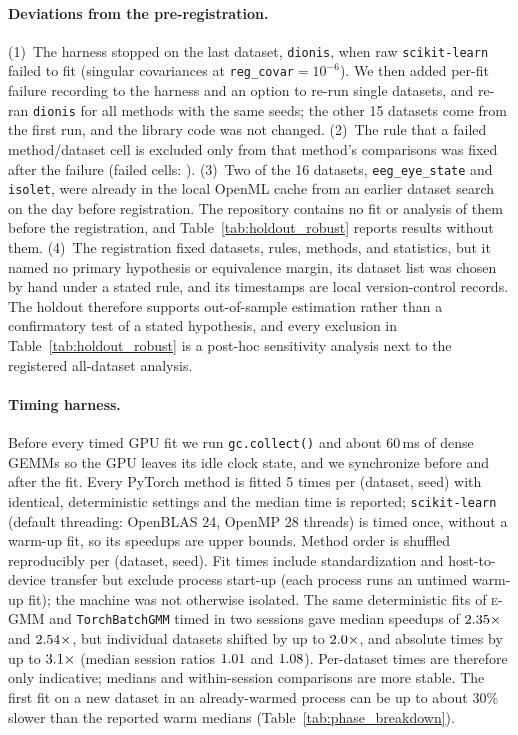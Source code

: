 \documentclass[10pt]{article} %
\newcommand{\egmm}{\textsc{e-GMM}}
\begin{document}
\paragraph{Deviations from the pre-registration.} (1)~The harness stopped on the last dataset, \texttt{dionis}, when raw \texttt{scikit-learn} failed to fit (singular covariances at \texttt{reg\_covar}$=10^{-6}$). We then added per-fit failure recording to the harness and an option to re-run single datasets, and re-ran \texttt{dionis} for all methods with the same seeds; the other 15 datasets come from the first run, and the library code was not changed. (2)~The rule that a failed method/dataset cell is excluded only from that method's comparisons was fixed after the failure (failed cells: \rHoldoutFailList). (3)~Two of the 16 datasets, \texttt{eeg\_eye\_state} and \texttt{isolet}, were already in the local OpenML cache from an earlier dataset search on the day before registration. The repository contains no fit or analysis of them before the registration, and Table~\ref{tab:holdout_robust} reports results without them. (4)~The registration fixed datasets, rules, methods, and statistics, but it named no primary hypothesis or equivalence margin, its dataset list was chosen by hand under a stated rule, and its timestamps are local version-control records. The holdout therefore supports out-of-sample estimation rather than a confirmatory test of a stated hypothesis, and every exclusion in Table~\ref{tab:holdout_robust} is a post-hoc sensitivity analysis next to the registered all-dataset analysis.

\paragraph{Timing harness.} Before every timed GPU fit we run \texttt{gc.collect()} and about 60\,ms of dense GEMMs so the GPU leaves its idle clock state, and we synchronize before and after the fit. Every PyTorch method is fitted 5 times per (dataset, seed) with identical, deterministic settings and the median time is reported; \texttt{scikit-learn} (default threading: OpenBLAS 24, OpenMP 28 threads) is timed once, without a warm-up fit, so its speedups are upper bounds. Method order is shuffled reproducibly per (dataset, seed). Fit times include standardization and host-to-device transfer but exclude process start-up (each process runs an untimed warm-up fit); the machine was not otherwise isolated. The same deterministic fits of \egmm{} and \texttt{TorchBatchGMM} timed in two sessions gave median speedups of $2.35\times$ and $2.54\times$, but individual datasets shifted by up to $2.0\times$, and absolute times by up to $3.1\times$ (median session ratios $1.01$ and $1.08$). Per-dataset times are therefore only indicative; medians and within-session comparisons are more stable. The first fit on a new dataset in an already-warmed process can be up to about 30\% slower than the reported warm medians (Table~\ref{tab:phase_breakdown}).
\end{document}
